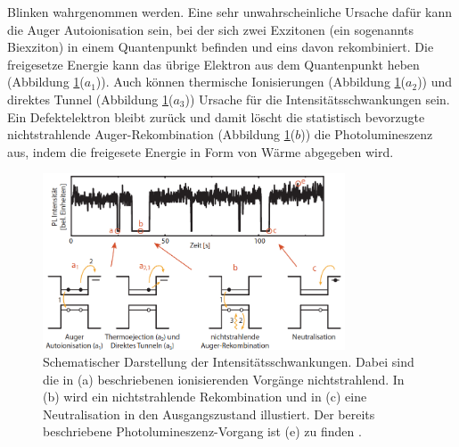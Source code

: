Blinken wahrgenommen werden. Eine sehr unwahrscheinliche Ursache dafür kann die
Auger Autoionisation sein, bei der sich zwei Exzitonen (ein sogenannts Biexziton)
in einem Quantenpunkt befinden und eins davon rekombiniert. Die freigesetze Energie
kann das übrige Elektron aus dem Quantenpunkt heben (Abbildung \ref{fig:blink}($a_1$)).
Auch können thermische Ionisierungen (Abbildung \ref{fig:blink}($a_2$)) und
direktes Tunnel (Abbildung \ref{fig:blink}($a_3$)) Ursache für die
Intensitätsschwankungen sein. Ein Defektelektron bleibt zurück und damit löscht
die statistisch bevorzugte nichtstrahlende Auger-Rekombination (Abbildung
\ref{fig:blink}($b$)) die Photolumineszenz aus, indem die freigesete Energie in
Form von Wärme abgegeben wird.

\begin{figure}[hbtp]
	\centering
	\includegraphics[width=0.8\textwidth]{Abb/blink.png}
	\caption{Schematischer Darstellung der Intensitätsschwankungen. Dabei sind die
	in (a) beschriebenen ionisierenden Vorgänge nichtstrahlend. In (b) wird ein
	nichtstrahlende Rekombination und in (c) eine Neutralisation in den Ausgangszustand
	illustiert. Der bereits beschriebene Photolumineszenz-Vorgang ist (e) zu finden
	\cite{blink}.}
	\label{fig:blink}
\end{figure}
\noindent
